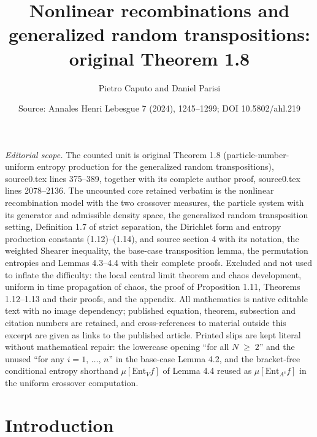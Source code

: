 \documentclass[10pt,a4paper]{amsart}
\title[Nonlinear recombinations and generalized random transpositions]{Nonlinear recombinations and generalized random transpositions: original Theorem 1.8}
\author{Pietro Caputo and Daniel Parisi}
\date{Source: Annales Henri Lebesgue 7 (2024), 1245--1299; DOI 10.5802/ahl.219}
\renewcommand{\geq}{\;\geqslant\;}
\newcommand{\ent}{\mathrm{Ent}}
\theoremstyle{definition}
\theoremstyle{plain}
\numberwithin{equation}{section}
\begin{document}
\maketitle
\noindent\textit{Editorial scope.} The counted unit is original Theorem 1.8 (particle-number-uniform entropy production for the generalized random transpositions), source0.tex lines 375--389, together with its complete author proof, source0.tex lines 2078--2136. The uncounted core retained verbatim is the nonlinear recombination model with the two crossover measures, the particle system with its generator and admissible density space, the generalized random transposition setting, Definition 1.7 of strict separation, the Dirichlet form and entropy production constants (1.12)--(1.14), and source section 4 with its notation, the weighted Shearer inequality, the base-case transposition lemma, the permutation entropies and Lemmas 4.3--4.4 with their complete proofs. Excluded and not used to inflate the difficulty: the local central limit theorem and chaos development, uniform in time propagation of chaos, the proof of Proposition 1.11, Theorems 1.12--1.13 and their proofs, and the appendix. All mathematics is native editable text with no image dependency; published equation, theorem, subsection and citation numbers are retained, and cross-references to material outside this excerpt are given as links to the published article. Printed slips are kept literal without mathematical repair: the lowercase opening ``for all $N\geq 2$'' and the unused ``for any $i=1,\,\dots,\,n$'' in the base-case Lemma 4.2, and the bracket-free conditional entropy shorthand $\mu[\ent_Vf]$ of Lemma 4.4 reused as $\mu[\ent_{A^c}f]$ in the uniform crossover computation.
\section{Introduction}\label{sec:1}
\end{document}
